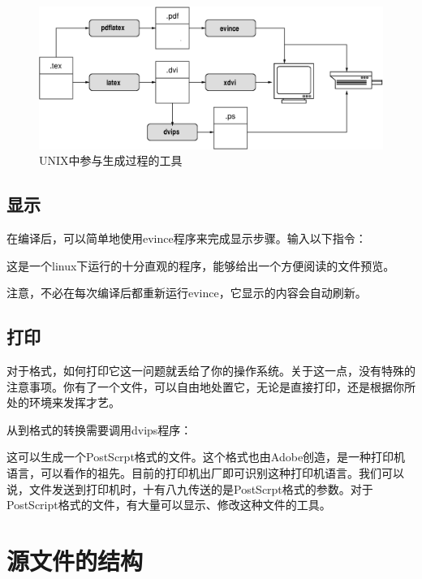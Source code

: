 \begin{figure}[H]
    \centering
    \includegraphics[width = 0.8\linewidth]{img/cycle.eps}
    \caption{UNIX中参与生成过程的工具}
    \label{fig:1.2}
\end{figure}

\subsection{显示}

在编译后，可以简单地使用\textsf{evince}程序来完成显示步骤。输入以下指令：


这是一个\textsf{linux}下运行的十分直观的程序，能够给出一个方便阅读的文件预览。

\begin{exclamation}
    注意，不必在每次编译后都重新运行evince，它显示的内容会自动刷新。\\
\end{exclamation}

\subsection{打印}

对于格式，如何打印它这一问题就丢给了你的操作系统。关于这一点，没有特殊的注意事项。你有了一个文件，可以自由地处置它，无论是直接打印，还是根据你所处的环境来发挥才艺。

\begin{ii}
    从到格式的转换需要调用dvips程序：\\
    
    这可以生成一个PostScrpt格式的文件。这个格式也由Adobe创造，是一种打印机语言，可以看作的祖先。目前的打印机出厂即可识别这种打印机语言。我们可以说，文件发送到打印机时，十有八九传送的是PostScrpt格式的参数。对于PostScript格式的文件，有大量可以显示、修改这种文件的工具。
\end{ii}

\section{源文件的结构}

